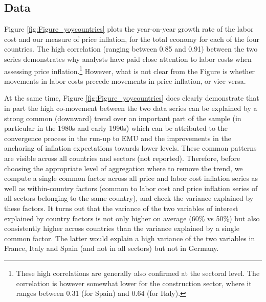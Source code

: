\documentclass[11pt]{article}
\begin{document}
\subsection{Data}
Figure \ref{fig:Figure_yoycountries} plots the year-on-year growth rate of the labor cost and our measure of price inflation, for the total economy for each of the four countries. The high correlation (ranging between 0.85 and 0.91) between the two series demonstrates why analysts have paid close attention to labor costs when assessing price inflation.\footnote{These high correlations are generally also confirmed at the sectoral level. The correlation is however somewhat lower for the construction sector, where it ranges between 0.31 (for Spain) and 0.64 (for Italy).} However, what is not clear from the Figure is whether movements in labor costs precede movements in price inflation, or vice versa. 


At the same time, Figure \ref{fig:Figure_yoycountries} does clearly demonstrate that in part the high co-movement between the two data series can be explained by a strong common (downward) trend over an important part of the sample (in particular in the 1980s and early 1990s) which can be attributed to the convergence process in the run-up to EMU and the improvements in the anchoring of inflation expectations towards lower levels.
These common patterns are visible across all countries and sectors (not reported). Therefore, before choosing the appropriate level of aggregation where to remove the trend, we compute a single common factor across all price and labor cost inflation series as well as within-country factors (common to labor cost and price inflation series of all sectors belonging to the same country), and check the variance explained by these factors. It turns out that the variance of the two variables of interest explained by country factors is not only higher on average (60\% vs 50\%) but also consistently higher across countries than the variance explained by a single common factor. The latter would explain a high variance of the two variables in France, Italy and Spain (and not in all sectors) but not in Germany. 
\end{document}

